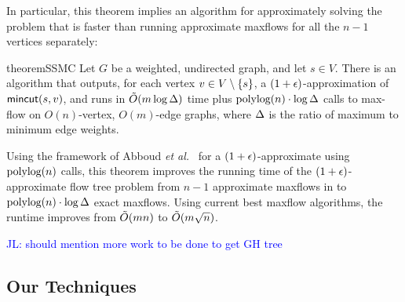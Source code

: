 In particular, this theorem implies an algorithm for approximately solving the \ssc problem that is faster than running approximate maxflows for all the $n-1$ vertices separately:

\begin{restatable}{theorem}{SSMC}
Let $G$ be a weighted, undirected graph, and let $s\in V$. There is an algorithm that outputs, for each vertex $v\in V\setminus\{s\}$, a $(1+\epsilon)$-approximation of $\textsf{\textup{mincut}}(s,v)$, and runs in $\tilde{O}(m\log\Delta)$ time plus $\textup{polylog}(n)\cdot \log\Delta$ calls to max-flow on $O(n)$-vertex, $O(m)$-edge graphs, where $\Delta$ is the ratio of maximum to minimum edge weights.
\end{restatable}

Using the framework of Abboud {\em et al.}~\cite{AbboudKT20b} for a $(1+\epsilon)$-approximate \apc using $\textup{polylog}(n)$ \ssc calls, this theorem improves the running time of the $(1+\epsilon)$-approximate flow tree problem from $n-1$ approximate maxflows in \cite{AbboudKT20b} to $\textup{polylog}(n)\cdot \log \Delta$ exact maxflows. Using current best maxflow algorithms, the runtime improves from $\tilde{O}(mn)$ to $\tilde{O}(m\sqrt{n})$.

\textcolor{blue}{JL: should mention more work to be done to get GH tree}

\subsection{Our Techniques}

